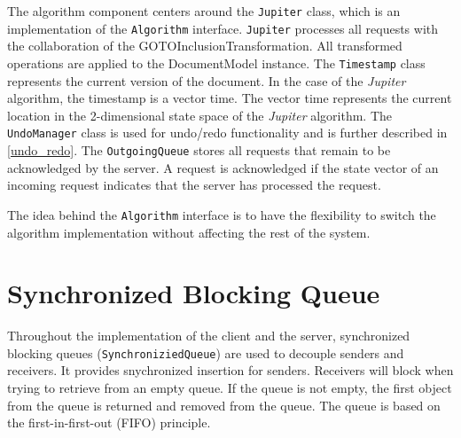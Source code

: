 The algorithm component centers around the \texttt{Jupiter} class, which is an implementation of the \texttt{Algorithm} interface. \texttt{Jupiter} processes all requests with the collaboration of the GOTOInclusionTransformation. All transformed operations are applied to the DocumentModel instance. The \texttt{Timestamp} class represents the current version of the document. In the case of the \emph{Jupiter} algorithm, the timestamp is a vector time. The vector time represents the current location in the 2-dimensional state space of the \emph{Jupiter} algorithm. The \texttt{UndoManager} class is used for undo/redo functionality and is further described in \ref{undo_redo}. The \texttt{OutgoingQueue} stores all requests that remain to be acknowledged by the server. A request is acknowledged if the state vector of an incoming request indicates that the server has processed the request.

The idea behind the \texttt{Algorithm} interface is to have the flexibility to switch the algorithm implementation without affecting the rest of the system.

\section{Synchronized Blocking Queue}
Throughout the implementation of the client and the server, synchronized blocking queues (\texttt{SynchroniziedQueue}) are used to decouple senders and receivers. It provides snychronized insertion for senders. Receivers will block when trying to retrieve from an empty queue. If the queue is not empty, the first object from the queue is returned and removed from the queue. The queue is based on the first-in-first-out (FIFO) principle.


